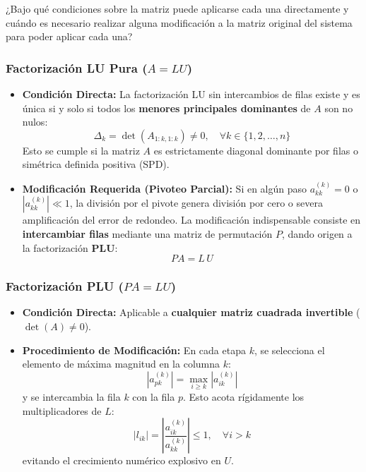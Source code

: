 \documentclass[11pt,a4paper]{article}
\theoremstyle{definition}
\theoremstyle{remark}
\begin{document}
\begin{solbox}[Pregunta 4]
¿Bajo qué condiciones sobre la matriz puede aplicarse cada una directamente y cuándo es necesario realizar alguna modificación a la matriz original del sistema para poder aplicar cada una?
\end{solbox}

\subsubsection{Factorización LU Pura ($A = LU$)}
\begin{itemize}[leftmargin=*]
    \item \textbf{Condición Directa:} La factorización LU sin intercambios de filas existe y es única si y solo si todos los \textbf{menores principales dominantes} de $A$ son no nulos:
    \begin{equation}
        \Delta_k = \det(A_{1:k, 1:k}) \neq 0, \quad \forall k \in \{1, 2, \dots, n\}
    \end{equation}
    Esto se cumple si la matriz $A$ es estrictamente diagonal dominante por filas o simétrica definida positiva (SPD).
    \item \textbf{Modificación Requerida (Pivoteo Parcial):} Si en algún paso $a_{kk}^{(k)} = 0$ o $|a_{kk}^{(k)}| \ll 1$, la división por el pivote genera división por cero o severa amplificación del error de redondeo. La modificación indispensable consiste en \textbf{intercambiar filas} mediante una matriz de permutación $P$, dando origen a la factorización $\mathbf{PLU}$:
    \begin{equation}
        P A = L \, U
    \end{equation}
\end{itemize}

\subsubsection{Factorización PLU ($PA = LU$)}
\begin{itemize}[leftmargin=*]
    \item \textbf{Condición Directa:} Aplicable a \textbf{cualquier matriz cuadrada invertible} ($\det(A) \neq 0$).
    \item \textbf{Procedimiento de Modificación:} En cada etapa $k$, se selecciona el elemento de máxima magnitud en la columna $k$:
    \begin{equation}
        |a_{p k}^{(k)}| = \max_{i \ge k} |a_{ik}^{(k)}|
    \end{equation}
    y se intercambia la fila $k$ con la fila $p$. Esto acota rígidamente los multiplicadores de $L$:
    \begin{equation}
        |l_{ik}| = \left| \frac{a_{ik}^{(k)}}{a_{kk}^{(k)}} \right| \le 1, \quad \forall i > k
    \end{equation}
    evitando el crecimiento numérico explosivo en $U$.
\end{itemize}
\end{document}
